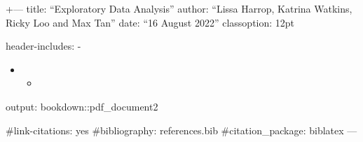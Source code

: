 \documentclass[
]{article}
\author{}
\date{\vspace{-2.5em}}
\begin{document}
+--- title: ``Exploratory Data Analysis'' author: ``Lissa Harrop,
Katrina Watkins, Ricky Loo and Max Tan'' date: ``16 August 2022''
classoption: 12pt

header-includes: -

\usepackage{newpxtext,eulerpx}

\begin{itemize}
\item
  \usepackage{bm,bbm}

  \begin{itemize}
  \item
    \usepackage{float}
  \end{itemize}
\end{itemize}

output: bookdown::pdf\_document2

\#link-citations: yes \#bibliography: references.bib
\#citation\_package: biblatex ---
\end{document}
